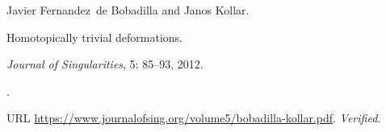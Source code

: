 Javier Fernandez~de Bobadilla and Janos Kollar.

\newblock Homotopically trivial deformations.

\newblock \emph{Journal of Singularities}, 5: 85--93, 2012.

\newblock {}.

\newblock URL \url{https://www.journalofsing.org/volume5/bobadilla-kollar.pdf}.
\newblock \emph{Verified}.

